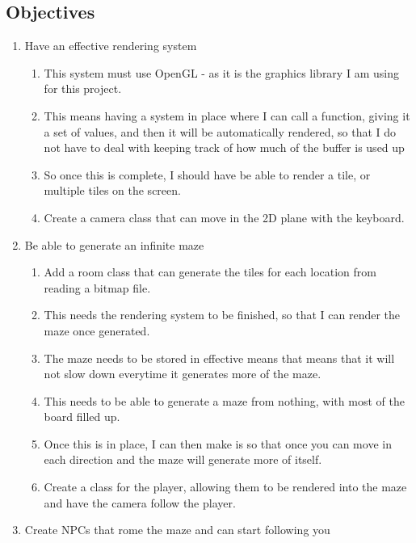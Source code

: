 \documentclass[../Main.tex]{subfiles}
\begin{document}
    \subsection{Objectives}
        \begin{enumerate}
            \item Have an effective rendering system
                \begin{enumerate}
                    \item This system must use OpenGL - as it is the graphics library I am using for this project.
                    \item This means having a system in place where I can call a function, giving it a set of values, and then it will be automatically rendered, so that I do not have to deal with keeping track of how much of the buffer is used up
                    \item So once this is complete, I should have be able to render a tile, or multiple tiles on the screen.
                    \item Create a camera class that can move in the 2D plane with the keyboard.
                \end{enumerate}
            \item Be able to generate an infinite maze
                \begin{enumerate}
                    \item Add a room class that can generate the tiles for each location from reading a bitmap file.
                    \item This needs the rendering system to be finished, so that I can render the maze once generated.
                    \item The maze needs to be stored in effective means that means that it will not slow down everytime it generates more of the maze.
                    \item This needs to be able to generate a maze from nothing, with most of the board filled up.
                    \item Once this is in place, I can then make is so that once you can move in each direction and the maze will generate more of itself.
                    \item Create a class for the player, allowing them to be rendered into the maze and have the camera follow the player.
                \end{enumerate}
            \item Create NPCs that rome the maze and can start following you

\end{enumerate}
\end{document}
